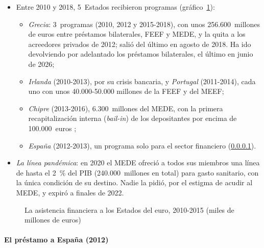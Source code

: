 \documentclass[11pt]{article}
\begin{document}
\begin{itemize}
\item Entre 2010 y 2018, 5~Estados recibieron programas (gráfico~\ref{fig:rescates}):
  \begin{itemize}
  \item \emph{Grecia}: 3~programas (2010, 2012 y 2015-2018), con unos 256.600~millones de euros entre préstamos bilaterales, FEEF y MEDE, y la quita a los acreedores privados de 2012; salió del último en agosto de 2018. Ha ido devolviendo por adelantado los préstamos bilaterales, el último en junio de 2026\nocite{MEDE2026Grecia};
  \item \emph{Irlanda} (2010-2013), por su crisis bancaria, y \emph{Portugal} (2011-2014), cada uno con unos 40.000-50.000 millones de la FEEF y del MEEF;
  \item \emph{Chipre} (2013-2016), 6.300~millones del MEDE, con la primera recapitalización interna (\emph{bail-in}) de los depositantes por encima de 100.000~euros ;
  \item \emph{España} (2012-2013), un programa solo para el sector financiero (\ref{sec:mede-espana}).
  \end{itemize}
\item \emph{La línea pandémica}: en 2020 el MEDE ofreció a todos sus miembros una línea de hasta el 2~\% del PIB (240.000~millones en total) para gasto sanitario, con la única condición de su destino. Nadie la pidió, por el estigma de acudir al MEDE, y expiró a finales de 2022\nocite{MEDE2022Pandemia}.
\end{itemize}

\begin{figure}[H]
\centering
\caption{La asistencia financiera a los Estados del euro, 2010-2015 (miles de millones de euros)}\label{fig:rescates}
\end{figure}

\paragraph{El préstamo a España (2012)}\label{sec:mede-espana}
\end{document}
